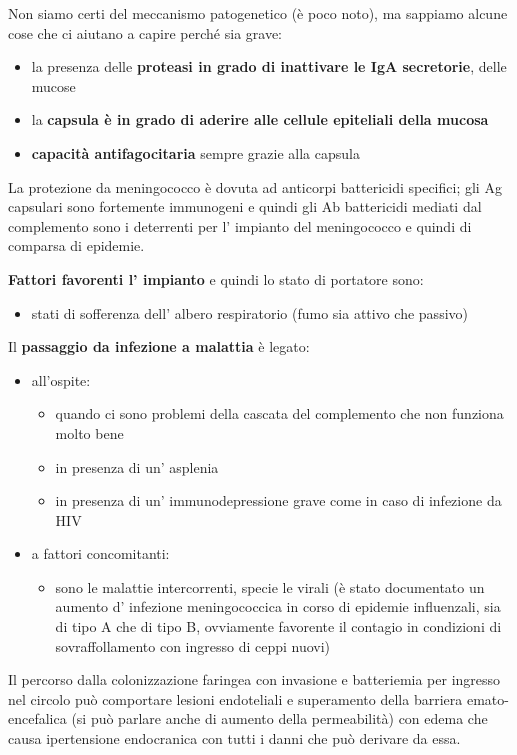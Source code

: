   Non siamo certi del meccanismo patogenetico (è poco noto), ma sappiamo
  alcune cose che ci aiutano a capire perché sia grave:
  \begin{itemize}
  
\item
  la presenza delle \textbf{proteasi in grado di inattivare le IgA
  secretorie}, delle mucose
\item
  la \textbf{capsula è in grado di aderire alle cellule epiteliali della
  mucosa}
\item
  \textbf{capacità antifagocitaria} sempre grazie alla capsula
\end{itemize}
  La protezione da meningococco è dovuta ad anticorpi battericidi
  specifici; gli Ag capsulari sono fortemente immunogeni e quindi gli Ab
  battericidi mediati dal complemento sono i deterrenti per l' impianto
  del meningococco e quindi di comparsa di epidemie.

  \textbf{Fattori favorenti l' impianto} e quindi lo stato di portatore
  sono:
  \begin{itemize}
 
\item
  stati di sofferenza dell' albero respiratorio (fumo sia attivo che
  passivo)
\end{itemize}
  Il \textbf{passaggio da infezione a malattia} è legato:

\begin{itemize}
\item
  all'ospite:

  \begin{itemize}
  \item
    quando ci sono problemi della cascata del complemento che non
    funziona molto bene
  \item
    in presenza di un' asplenia
  \item
    in presenza di un' immunodepressione grave come in caso di infezione
    da HIV
  \end{itemize}
\item
  a fattori concomitanti:

  \begin{itemize}
  \item
    sono le malattie intercorrenti, specie le virali (è stato
    documentato un aumento d' infezione meningococcica in corso di
    epidemie influenzali, sia di tipo A che di tipo B, ovviamente
    favorente il contagio in condizioni di sovraffollamento con ingresso
    di ceppi nuovi)
\end{itemize}
\end{itemize}
    Il percorso dalla colonizzazione faringea con invasione e
    batteriemia per ingresso nel circolo può comportare lesioni
    endoteliali e superamento della barriera emato-encefalica (si può
    parlare anche di aumento della permeabilità) con edema che causa
    ipertensione endocranica con tutti i danni che può derivare da essa.

